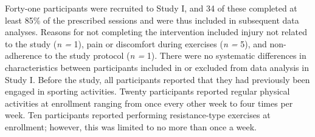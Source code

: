 \documentclass[twoside,10pt]{gihclass} %
\begin{document}
Forty-one participants were recruited to Study I, and 34 of these completed at least 85\% of the prescribed sessions and were thus included in subsequent data analyses. Reasons for not completing the intervention included injury not related to the study (\emph{n =} 1), pain or discomfort during exercises (\emph{n =} 5), and non-adherence to the study protocol (\emph{n =} 1). There were no systematic differences in characteristics between participants included in or excluded from data analysis in Study I. Before the study, all participants reported that they had previously been engaged in sporting activities. Twenty participants reported regular physical activities at enrollment ranging from once every other week to four times per week. Ten participants reported performing resistance-type exercises at enrollment; however, this was limited to no more than once a week.
\end{document}

